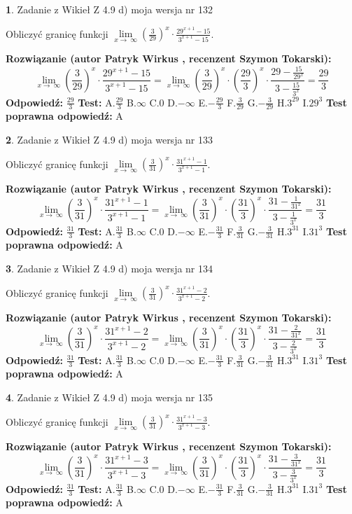 \documentclass[12pt, a4paper]{article}
\theoremstyle{definition} %
\newtheorem{zad}{}
\newcommand{\zadStart}[1]{\begin{zad}#1\newline}
\newcommand{\zadStop}{\end{zad}}
\newcommand{\rozwStart}[2]{\noindent \textbf{Rozwiązanie (autor #1 , recenzent #2): }\newline}
\newcommand{\rozwStop}{\newline}
\newcommand{\odpStart}{\noindent \textbf{Odpowiedź:}\newline}
\newcommand{\odpStop}{\newline}
\newcommand{\testStart}{\noindent \textbf{Test:}\newline}
\newcommand{\testStop}{\newline}
\newcommand{\kluczStart}{\noindent \textbf{Test poprawna odpowiedź:}\newline}
\newcommand{\kluczStop}{\newline}
\begin{document}
\zadStart{Zadanie z Wikieł Z 4.9 d) moja wersja nr 132}


Obliczyć granicę funkcji  $\lim\limits_{x\to\ \infty}(\frac{3}{29})^{x}\cdot\frac{29^{x+1}-15}{3^{x+1}-15}$.
\zadStop
\rozwStart{Patryk Wirkus}{Szymon Tokarski}
$$\lim\limits_{x\to\ \infty}(\frac{3}{29})^{x}\cdot\frac{29^{x+1}-15}{3^{x+1}-15}=\lim\limits_{x\to\ \infty}(\frac{3}{29})^{x}\cdot(\frac{29}{3})^{x} \cdot \frac{29-\frac{15}{29^{x}}}{3-\frac{15}{3^{x}}} = \frac{29}{3}$$
\rozwStop
\odpStart
$\frac{29}{3}$
\odpStop
\testStart
A.$\frac{29}{3}$ B.$\infty$ C.$0$ D.$-\infty$ E.$-\frac{29}{3}$
F.$\frac{3}{29}$ G.$-\frac{3}{29}$
H.$3^{29}$
I.$29^{3}$
\testStop
\kluczStart
A
\kluczStop



\zadStart{Zadanie z Wikieł Z 4.9 d) moja wersja nr 133}


Obliczyć granicę funkcji  $\lim\limits_{x\to\ \infty}(\frac{3}{31})^{x}\cdot\frac{31^{x+1}-1}{3^{x+1}-1}$.
\zadStop
\rozwStart{Patryk Wirkus}{Szymon Tokarski}
$$\lim\limits_{x\to\ \infty}(\frac{3}{31})^{x}\cdot\frac{31^{x+1}-1}{3^{x+1}-1}=\lim\limits_{x\to\ \infty}(\frac{3}{31})^{x}\cdot(\frac{31}{3})^{x} \cdot \frac{31-\frac{1}{31^{x}}}{3-\frac{1}{3^{x}}} = \frac{31}{3}$$
\rozwStop
\odpStart
$\frac{31}{3}$
\odpStop
\testStart
A.$\frac{31}{3}$ B.$\infty$ C.$0$ D.$-\infty$ E.$-\frac{31}{3}$
F.$\frac{3}{31}$ G.$-\frac{3}{31}$
H.$3^{31}$
I.$31^{3}$
\testStop
\kluczStart
A
\kluczStop



\zadStart{Zadanie z Wikieł Z 4.9 d) moja wersja nr 134}


Obliczyć granicę funkcji  $\lim\limits_{x\to\ \infty}(\frac{3}{31})^{x}\cdot\frac{31^{x+1}-2}{3^{x+1}-2}$.
\zadStop
\rozwStart{Patryk Wirkus}{Szymon Tokarski}
$$\lim\limits_{x\to\ \infty}(\frac{3}{31})^{x}\cdot\frac{31^{x+1}-2}{3^{x+1}-2}=\lim\limits_{x\to\ \infty}(\frac{3}{31})^{x}\cdot(\frac{31}{3})^{x} \cdot \frac{31-\frac{2}{31^{x}}}{3-\frac{2}{3^{x}}} = \frac{31}{3}$$
\rozwStop
\odpStart
$\frac{31}{3}$
\odpStop
\testStart
A.$\frac{31}{3}$ B.$\infty$ C.$0$ D.$-\infty$ E.$-\frac{31}{3}$
F.$\frac{3}{31}$ G.$-\frac{3}{31}$
H.$3^{31}$
I.$31^{3}$
\testStop
\kluczStart
A
\kluczStop



\zadStart{Zadanie z Wikieł Z 4.9 d) moja wersja nr 135}


Obliczyć granicę funkcji  $\lim\limits_{x\to\ \infty}(\frac{3}{31})^{x}\cdot\frac{31^{x+1}-3}{3^{x+1}-3}$.
\zadStop
\rozwStart{Patryk Wirkus}{Szymon Tokarski}
$$\lim\limits_{x\to\ \infty}(\frac{3}{31})^{x}\cdot\frac{31^{x+1}-3}{3^{x+1}-3}=\lim\limits_{x\to\ \infty}(\frac{3}{31})^{x}\cdot(\frac{31}{3})^{x} \cdot \frac{31-\frac{3}{31^{x}}}{3-\frac{3}{3^{x}}} = \frac{31}{3}$$
\rozwStop
\odpStart
$\frac{31}{3}$
\odpStop
\testStart
A.$\frac{31}{3}$ B.$\infty$ C.$0$ D.$-\infty$ E.$-\frac{31}{3}$
F.$\frac{3}{31}$ G.$-\frac{3}{31}$
H.$3^{31}$
I.$31^{3}$
\testStop
\kluczStart
A
\kluczStop
\end{document}
